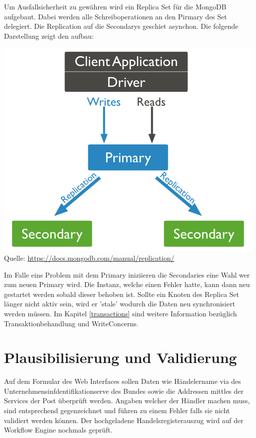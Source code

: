 Um Ausfallsicherheit zu gewähren wird ein Replica Set für die MongoDB aufgebaut. Dabei werden alle Schreiboperationen an den Pirmary des Set delegiert. Die Replication auf die Secondarys geschiet asynchon. Die folgende Darstellung zeigt den aufbau:
\begin{center}
	\includegraphics[scale=0.6]{mongodb-replicaset.png}\newline
	Quelle: \url{https://docs.mongodb.com/manual/replication/}
\end{center}
Im Falle eins Problem mit dem Primary iniziieren die Secondaries eine Wahl wer zum neuen Primary wird. Die Instanz, welche einen Fehler hatte, kann dann neu gestartet werden sobald dieser behoben ist. Sollte ein Knoten des Replica Set länger nicht aktiv sein, wird er 'stale' wodurch die Daten neu synchronisiert werden müssen. Im Kapitel \ref{transactions} sind weitere Information bezüglich Transaktionbehandlung und WriteConcerns.

\section{Plausibilisierung und Validierung}

Auf dem Formular des Web Interfaces sollen Daten wie Händelername via des Unternehmensinfdentifikationserve des Bundes sowie die Addressen mittles der Services der Post überprüft werden. Angaben welcher der Händler machen muss, sind entsprechend gegenzeichnet und führen zu einem Fehler falls sie nicht validiert werden können. Der hochgeladene Handelsregisterauszug wird auf der Workflow Engine nochmals geprüft.

